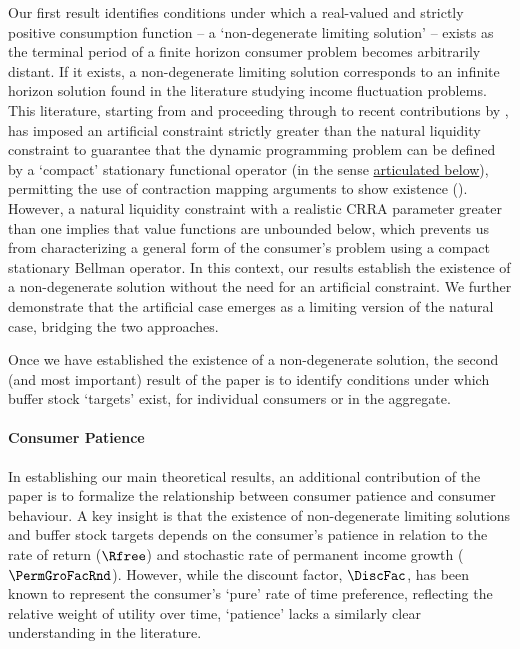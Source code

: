 \documentclass[BufferStockTheory]{subfiles}
\begin{document}
Our first result identifies conditions under which a real-valued and strictly positive consumption function -- a `non-degenerate limiting solution' -- exists as the terminal period of a finite horizon consumer problem becomes arbitrarily distant. If it exists, a non-degenerate limiting solution corresponds to an infinite horizon solution found in the literature studying income fluctuation problems. This literature, starting from \cite{bewleyPIH} and proceeding through to recent contributions by \cite{mstIncFluct,maUnboundedDP}, has imposed an artificial constraint strictly greater than the natural liquidity constraint to guarantee that the dynamic programming problem can be defined by a `compact' stationary functional operator (in the sense \hyperlink{challengesDP}{articulated below}), permitting the use of contraction mapping arguments to show existence (\cite{maUnboundedDP, stachurski2022}). However, a natural liquidity constraint with a realistic CRRA parameter greater than one implies that value functions are unbounded below, which prevents us from characterizing a general form of the consumer's problem using a compact stationary Bellman operator. In this context, our results establish the existence of a non-degenerate solution without the need for an artificial constraint. We further demonstrate that the artificial case emerges as a limiting version of the natural case, bridging the two approaches.

Once we have established the existence of a non-degenerate solution, the second (and most important) result of the paper is to identify conditions under which buffer stock `targets' exist, for individual consumers or in the aggregate.


\paragraph{Consumer Patience}

In establishing our main theoretical results, an additional contribution of the paper is to formalize the relationship between consumer patience and consumer behaviour. A key insight is that the existence of non-degenerate limiting solutions and buffer stock targets depends on the consumer's patience in relation to the rate of return ($\Rfree$) and stochastic rate of permanent income growth ($\PermGroFacRnd$). However, while the discount factor, $\DiscFac$, has been known to represent the consumer's `pure' rate of time preference, reflecting the relative weight of utility over time, `patience' lacks a similarly clear understanding in the literature. 
\end{document}
